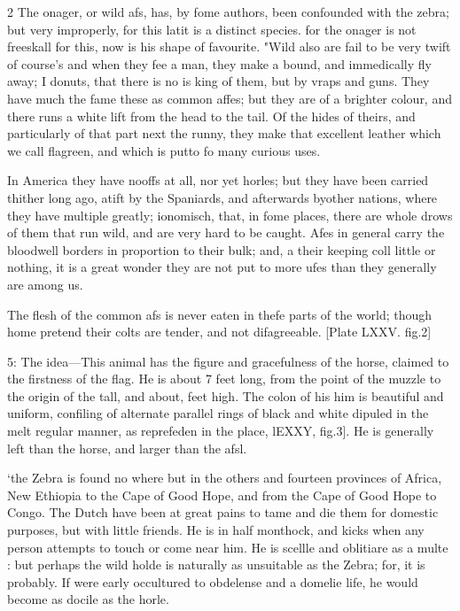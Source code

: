 \documentclass[10pt]{article}
\begin{document}
\begin{multicols}{2}\raggedcolumns
The onager, or wild afs, has, by fome authors,  been confounded with the zebra; but very improperly, for this latit is a distinct species. for the onager is not freeskall for this, now is his shape of favourite. "Wild also are fail to be very twift of course’s and when they fee a man, they make a bound, and immedically fly away; I donuts, that there is no is king of them, but by vraps and guns. They have much the fame these as common affes; but they are of a brighter colour, and there runs a white lift from the head to the tail. Of the hides of theirs, and particularly of that part next the runny, they make that excellent leather which we call flagreen, and which is putto fo many curious uses.

In America they have nooffs at all, nor yet horles; but they have been carried thither long ago, atift by the Spaniards, and afterwards byother nations, where they have multiple greatly; ionomisch, that, in fome places, there are whole drows of them that run wild, and are very hard to be caught. Afes in general carry the bloodwell borders in proportion to their bulk; and, a their keeping coll little or nothing, it is a great wonder they are not put to more ufes than they generally are among us.

The flesh of the common afs is never eaten in thefe parts of the world; though home pretend their colts are tender, and not difagreeable. [Plate LXXV. fig.2]

5: The idea—This animal has the figure and gracefulness of the horse, claimed to the firstness of the flag. He is about 7 feet long, from the point of the muzzle to the origin of the tall, and about, feet high. The colon of his him is beautiful and uniform, confiling of alternate parallel rings of black and white dipuled in the melt regular manner, as reprefeden in the place, lEXXY, fig.3]. He is generally left than the horse, and larger than the afsl.

‘the Zebra is found no where but in the others and fourteen provinces of Africa, New Ethiopia to the Cape of Good Hope, and from the Cape of Good Hope to Congo. The Dutch have been at great pains to tame and die them for domestic purposes, but with little friends. He is in half monthock, and kicks when any person attempts to touch or come near him. He is scellle and oblitiare as a multe : but perhaps the wild holde is naturally as unsuitable as the Zebra; for, it is probably. If were early occultured to obdelense and a domelie life, he would become as docile as the horle.


\end{multicols}
\end{document}
